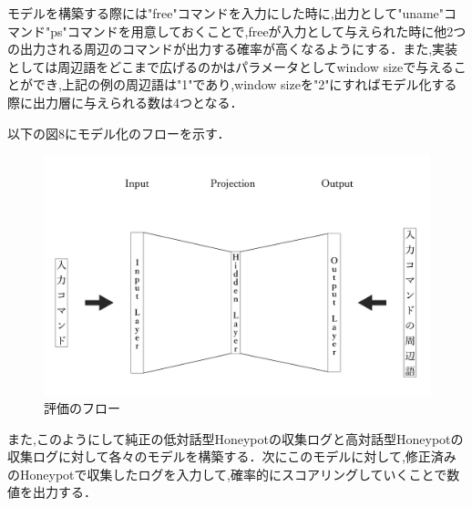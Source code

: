 \vspace{5mm}

\vspace{5mm}

モデルを構築する際には"free"コマンドを入力にした時に,出力として"uname"コマンド"ps"コマンドを用意しておくことで,freeが入力として与えられた時に他2つの出力される周辺のコマンドが出力する確率が高くなるようにする．また,実装としては周辺語をどこまで広げるのかはパラメータとしてwindow sizeで与えることができ,上記の例の周辺語は"1"であり,window sizeを"2"にすればモデル化する際に出力層に与えられる数は4つとなる．

以下の図8にモデル化のフローを示す．
\vspace{10mm}
\begin{figure}[H]
    \centering
    \includegraphics[width=1.0\textwidth]{figures/model.png}
    \caption{評価のフロー\cite{word2vecpaper}\cite{word2vecpaper2}}
    \label{fig:evo}
\end{figure}
\vspace{10mm}
また,このようにして純正の低対話型Honeypotの収集ログと高対話型Honeypotの収集ログに対して各々のモデルを構築する．次にこのモデルに対して,修正済みのHoneypotで収集したログを入力して,確率的にスコアリングしていくことで数値を出力する．\\

